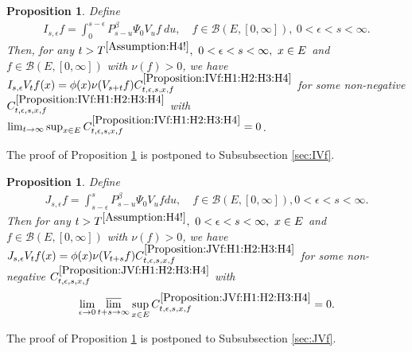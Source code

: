 \documentclass[12pt,a4paper]{amsart}
\numberwithin{equation}{section}
\theoremstyle{plain}
\newtheorem{prop}[thm]{Proposition}
\theoremstyle{definition}
\theoremstyle{remark}
\newcounter{N}
\newcounter{n}[N]
\begin{document}
\begin{prop} \label{Proposition:IVf:H1:H2:H3:H4} 
	Define 
\begin{align} 
	I_{s,\epsilon} f 
 	= \int_0^{s - \epsilon} P_{s - u}^\beta \Psi_0 V_u f ~du,
 	\quad f\in \mathcal B(E,[0,\infty]),~0 < \epsilon < s < \infty.
\end{align} 
	Then, for any $t> T^{\ref{Assumption:H4!}},~0<\epsilon<s< \infty,~x\in E$ and $f\in \mathcal B(E,[0,\infty])$ with $\nu(f)>0$, we have $I_{s,\epsilon}V_t f(x) = \phi(x) \nu(V_{s+t} f) C^{\ref{Proposition:IVf:H1:H2:H3:H4}}_{t,\epsilon, s, x,f}$ for some non-negative $C^{\ref{Proposition:IVf:H1:H2:H3:H4}}_{t,\epsilon, s, x,f}$ with $\lim_{t\to \infty} \sup_{x\in E} C^{\ref{Proposition:IVf:H1:H2:H3:H4}}_{t,\epsilon, s, x,f} = 0$.
\end{prop}

The proof of Proposition \ref{Proposition:IVf:H1:H2:H3:H4} is postponed to Subsubsection \ref{sec:IVf}.

\begin{prop} \label{Proposition:JVf:H1:H2:H3:H4} 
	Define 
\begin{align}
	J_{s,\epsilon} f 
 	= \int_{s-\epsilon}^s P_{s-u}^\beta \Psi_0 V_u f du,
 	\quad f\in \mathcal B(E,[0,\infty]), 0< \epsilon < s< \infty.
\end{align}
	Then for any $t>T^{\ref{Assumption:H4!}},~0<\epsilon<s< \infty,~x\in E$ and $f\in \mathcal B(E,[0,\infty])$ with $\nu(f)>0$, we have $ J_{s,\epsilon} V_tf(x) = \phi(x) \nu(V_{t+s}f) C^{\ref{Proposition:JVf:H1:H2:H3:H4}}_{t,\epsilon,s,x,f}$ for some non-negative $C^{\ref{Proposition:JVf:H1:H2:H3:H4}}_{t,\epsilon,s,x,f}$ with \[\lim_{\epsilon \to 0}\varlimsup_{t+s\to \infty} \sup_{x\in E} C^{\ref{Proposition:JVf:H1:H2:H3:H4}}_{t,\epsilon,s,x,f} =0.\]
\end{prop}

The proof of Proposition \ref{Proposition:JVf:H1:H2:H3:H4} is postponed to Subsubsection \ref{sec:JVf}.
\end{document}
